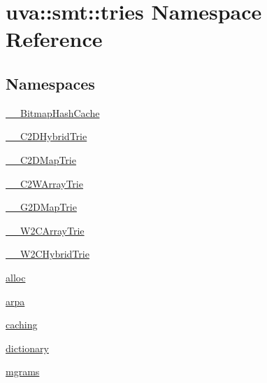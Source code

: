 \hypertarget{namespaceuva_1_1smt_1_1tries}{}\section{uva\+:\+:smt\+:\+:tries Namespace Reference}
\label{namespaceuva_1_1smt_1_1tries}
\subsection*{Namespaces}
\begin{DoxyCompactItemize}
\item 
 \hyperlink{namespaceuva_1_1smt_1_1tries_1_1_____bitmap_hash_cache}{\+\_\+\+\_\+\+Bitmap\+Hash\+Cache}
\item 
 \hyperlink{namespaceuva_1_1smt_1_1tries_1_1_____c2_d_hybrid_trie}{\+\_\+\+\_\+\+C2\+D\+Hybrid\+Trie}
\item 
 \hyperlink{namespaceuva_1_1smt_1_1tries_1_1_____c2_d_map_trie}{\+\_\+\+\_\+\+C2\+D\+Map\+Trie}
\item 
 \hyperlink{namespaceuva_1_1smt_1_1tries_1_1_____c2_w_array_trie}{\+\_\+\+\_\+\+C2\+W\+Array\+Trie}
\item 
 \hyperlink{namespaceuva_1_1smt_1_1tries_1_1_____g2_d_map_trie}{\+\_\+\+\_\+\+G2\+D\+Map\+Trie}
\item 
 \hyperlink{namespaceuva_1_1smt_1_1tries_1_1_____w2_c_array_trie}{\+\_\+\+\_\+\+W2\+C\+Array\+Trie}
\item 
 \hyperlink{namespaceuva_1_1smt_1_1tries_1_1_____w2_c_hybrid_trie}{\+\_\+\+\_\+\+W2\+C\+Hybrid\+Trie}
\item 
 \hyperlink{namespaceuva_1_1smt_1_1tries_1_1alloc}{alloc}
\item 
 \hyperlink{namespaceuva_1_1smt_1_1tries_1_1arpa}{arpa}
\item 
 \hyperlink{namespaceuva_1_1smt_1_1tries_1_1caching}{caching}
\item 
 \hyperlink{namespaceuva_1_1smt_1_1tries_1_1dictionary}{dictionary}
\item 
 \hyperlink{namespaceuva_1_1smt_1_1tries_1_1mgrams}{mgrams}
\end{DoxyCompactItemize}
